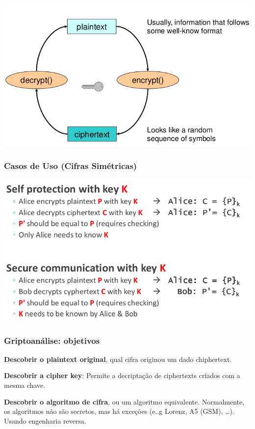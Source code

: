 \documentclass{article}
\begin{document}
\begin{flushleft}
  \begin{center}
    \includegraphics[scale=0.3]{67}
  \end{center}

  \pagebreak

  \subsubsection{Casos de Uso (Cifras Simétricas)}

  \begin{center}
    \includegraphics[scale=0.3]{68}
  \end{center}

  \subsubsection{Griptoanálise: objetivos}

  \begin{flushleft}
    \textbf{Descobrir o plaintext original}, qual cifra originou um dado chiphertext.

    \vspace{2mm}

    \textbf{Descobrir a cipher key}: Permite a decriptação de ciphertexts criados
    com a mesma chave.

    \vspace{2mm}

    \textbf{Descobrir o algoritmo de cifra}, ou um algoritmo equivalente. Normalmente,
    os algoritmos não são secretos, mas há exceções (e..g Lorenz, A5 (GSM), \dots). Usando
    engenharia reversa.
  \end{flushleft}
\end{flushleft}
\end{document}
